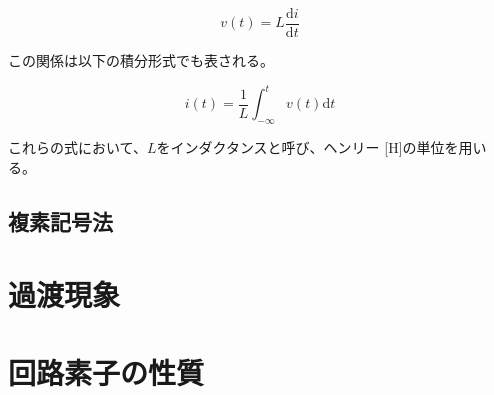 \documentclass{ltjsreport}
\newcommand{\diff}{\mathrm{d}}
\newcommand{\dft}[1]{\frac{\mathrm{d}#1}{\mathrm{d}t}}
\begin{document}
\begin{equation}
  v(t) = L \dft{i}
\end{equation}

この関係は以下の積分形式でも表される。

\begin{equation}
  i(t) = \frac{1}{L}\int_{-\infty}^{t} v(t)\diff t
\end{equation}

これらの式において、$L$をインダクタンスと呼び、ヘンリー [H]の単位を用いる。


\subsection{複素記号法}


\section{過渡現象}

\section{回路素子の性質}









\end{document}
